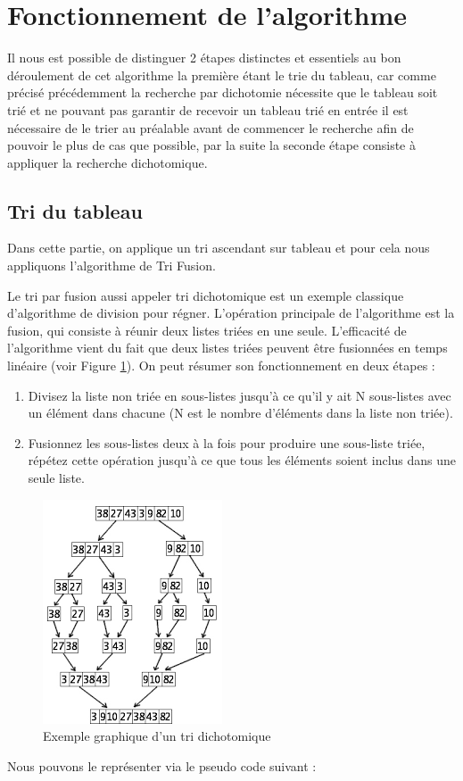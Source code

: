 \section{Fonctionnement de l'algorithme}
Il nous est possible de distinguer 2 étapes distinctes et essentiels au bon déroulement de cet algorithme la première étant le trie du tableau, car comme précisé précédemment la recherche par dichotomie nécessite que le tableau soit trié et ne pouvant pas garantir de recevoir un tableau trié en entrée il est nécessaire de le trier au préalable avant de commencer le recherche afin de pouvoir le plus de cas que possible, par la suite la seconde étape consiste à appliquer la recherche dichotomique.

\subsection{Tri du tableau}
Dans cette partie, on applique un tri ascendant sur tableau et pour cela nous appliquons l'algorithme de Tri Fusion.
\par
Le tri par fusion aussi appeler tri dichotomique est un exemple classique d'algorithme de division pour régner. L'opération principale de l'algorithme est la fusion, qui consiste à réunir deux listes triées en une seule. L'efficacité de l'algorithme vient du fait que deux listes triées peuvent être fusionnées en temps linéaire (voir Figure \ref{fig:tri_dico}). On peut résumer son fonctionnement en deux étapes :
\begin{enumerate}
  \item Divisez la liste non triée en sous-listes jusqu'à ce qu'il y ait N sous-listes avec un élément dans chacune (N est le nombre d'éléments dans la liste non triée).
  \item Fusionnez les sous-listes deux à la fois pour produire une sous-liste triée, répétez cette opération jusqu'à ce que tous les éléments soient inclus dans une seule liste.
\end{enumerate}

\begin{figure}[H]
    \centering
        \includegraphics[scale=1.0]{./ressources/trifusion.png}
        \caption{Exemple graphique d'un tri dichotomique}
    \label{fig:tri_dico}
\end{figure}
\par
Nous pouvons le représenter via le pseudo code suivant :

